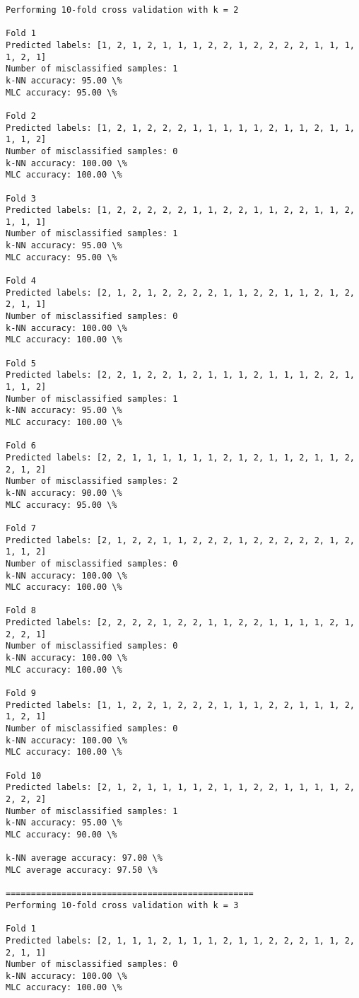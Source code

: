 \documentclass[11pt]{article}
\begin{document}
    \begin{Verbatim}[commandchars=\\\{\}]
Performing 10-fold cross validation with k = 2

Fold 1
Predicted labels: [1, 2, 1, 2, 1, 1, 1, 2, 2, 1, 2, 2, 2, 2, 1, 1, 1, 1, 2, 1]
Number of misclassified samples: 1
k-NN accuracy: 95.00 \%
MLC accuracy: 95.00 \%

Fold 2
Predicted labels: [1, 2, 1, 2, 2, 2, 1, 1, 1, 1, 1, 2, 1, 1, 2, 1, 1, 1, 1, 2]
Number of misclassified samples: 0
k-NN accuracy: 100.00 \%
MLC accuracy: 100.00 \%

Fold 3
Predicted labels: [1, 2, 2, 2, 2, 2, 1, 1, 2, 2, 1, 1, 2, 2, 1, 1, 2, 1, 1, 1]
Number of misclassified samples: 1
k-NN accuracy: 95.00 \%
MLC accuracy: 95.00 \%

Fold 4
Predicted labels: [2, 1, 2, 1, 2, 2, 2, 2, 1, 1, 2, 2, 1, 1, 2, 1, 2, 2, 1, 1]
Number of misclassified samples: 0
k-NN accuracy: 100.00 \%
MLC accuracy: 100.00 \%

Fold 5
Predicted labels: [2, 2, 1, 2, 2, 1, 2, 1, 1, 1, 2, 1, 1, 1, 2, 2, 1, 1, 1, 2]
Number of misclassified samples: 1
k-NN accuracy: 95.00 \%
MLC accuracy: 100.00 \%

Fold 6
Predicted labels: [2, 2, 1, 1, 1, 1, 1, 1, 2, 1, 2, 1, 1, 2, 1, 1, 2, 2, 1, 2]
Number of misclassified samples: 2
k-NN accuracy: 90.00 \%
MLC accuracy: 95.00 \%

Fold 7
Predicted labels: [2, 1, 2, 2, 1, 1, 2, 2, 2, 1, 2, 2, 2, 2, 2, 1, 2, 1, 1, 2]
Number of misclassified samples: 0
k-NN accuracy: 100.00 \%
MLC accuracy: 100.00 \%

Fold 8
Predicted labels: [2, 2, 2, 2, 1, 2, 2, 1, 1, 2, 2, 1, 1, 1, 1, 2, 1, 2, 2, 1]
Number of misclassified samples: 0
k-NN accuracy: 100.00 \%
MLC accuracy: 100.00 \%

Fold 9
Predicted labels: [1, 1, 2, 2, 1, 2, 2, 2, 1, 1, 1, 2, 2, 1, 1, 1, 2, 1, 2, 1]
Number of misclassified samples: 0
k-NN accuracy: 100.00 \%
MLC accuracy: 100.00 \%

Fold 10
Predicted labels: [2, 1, 2, 1, 1, 1, 1, 2, 1, 1, 2, 2, 1, 1, 1, 1, 2, 2, 2, 2]
Number of misclassified samples: 1
k-NN accuracy: 95.00 \%
MLC accuracy: 90.00 \%

k-NN average accuracy: 97.00 \%
MLC average accuracy: 97.50 \%

=================================================
Performing 10-fold cross validation with k = 3

Fold 1
Predicted labels: [2, 1, 1, 1, 2, 1, 1, 1, 2, 1, 1, 2, 2, 2, 1, 1, 2, 2, 1, 1]
Number of misclassified samples: 0
k-NN accuracy: 100.00 \%
MLC accuracy: 100.00 \%


\end{Verbatim}
\end{document}
